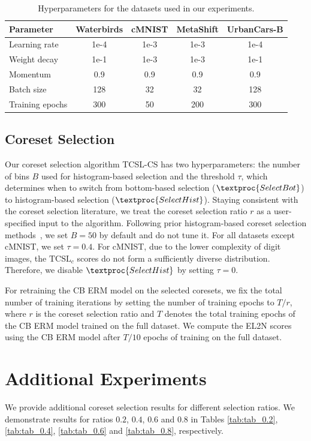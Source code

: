 \documentclass[letter,11pt]{article}
\begin{document}
\begin{table}[t]
\centering
\small
\setlength{\tabcolsep}{4pt}
\begin{tabular}{lcccc}
\toprule
\textbf{Parameter} & \textbf{Waterbirds} & \textbf{cMNIST} & \textbf{MetaShift} & \textbf{UrbanCars-B} \\
\midrule
Learning rate    & 1e-4 & 1e-3 & 1e-3 & 1e-4 \\
Weight decay     & 1e-1 & 1e-3 & 1e-3 & 1e-1 \\
Momentum         & 0.9  & 0.9  & 0.9  & 0.9  \\
Batch size       & 128  & 32   & 32   & 128  \\
Training epochs  & 300  & 50   & 200  & 300  \\
\bottomrule
\end{tabular}
\caption{Hyperparameters for the datasets used in our experiments.}
\label{table:hyperparams}
\end{table}

\subsection{Coreset Selection}
Our coreset selection algorithm TCSL-CS has two hyperparameters: the number of bins $B$ used for histogram-based selection and the threshold $\tau$, which determines when to switch from bottom-based selection ($\textproc{SelectBot}$) to histogram-based selection ($\textproc{SelectHist}$). Staying consistent with the coreset selection literature, we treat the coreset selection ratio $r$ as a user-specified input to the algorithm. Following prior histogram-based coreset selection methods~\citep{HistCS}, we set $B\!=\!50$ by default and do not tune it. For all datasets except cMNIST, we set $\tau\!=\!0.4$. For cMNIST, due to the lower complexity of digit images, the $\text{TCSL}_c$ scores do not form a sufficiently diverse distribution. Therefore, we disable $\textproc{SelectHist}$ by setting $\tau\!=\!0$.

For retraining the CB ERM model on the selected coresets, we fix the total number of training iterations by setting the number of training epochs to $T/r$, where $r$ is the coreset selection ratio and $T$ denotes the total training epochs of the CB ERM model trained on the full dataset. We compute the EL2N \citep{EL2N} scores using the CB ERM model after $T/10$ epochs of training on the full dataset.
\section{Additional Experiments}\label{sec:app_add_exp}
We provide additional coreset selection results for different selection ratios. We demonstrate results for ratios $0.2$, $0.4$, $0.6$ and $0.8$ in Tables \ref{tab:tab_0.2}, \ref{tab:tab_0.4}, \ref{tab:tab_0.6} and \ref{tab:tab_0.8}, respectively.
\end{document}
